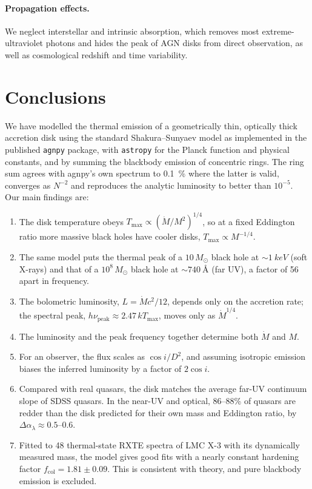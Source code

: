\documentclass[11pt,a4paper]{article}
\newcommand{\Msun}{M_\odot}
\newcommand{\Mdot}{\dot M}
\newcommand{\Tmax}{T_{\max}}
\newcommand{\nupk}{\nu_{\mathrm{peak}}}
\begin{document}
\paragraph{Propagation effects.} We neglect interstellar and intrinsic
absorption, which removes most extreme-ultraviolet photons and
hides the peak of AGN disks from direct observation, as well as
cosmological redshift and time variability.

\section{Conclusions}

We have modelled the thermal emission of a geometrically thin, optically
thick accretion disk using the standard Shakura--Sunyaev model as implemented
in the published \texttt{agnpy} package, with \texttt{astropy} for the
Planck function and physical constants, and by summing the blackbody
emission of concentric rings. The ring sum agrees with agnpy's own spectrum
to \SI{0.1}{\percent} where the latter is valid, converges as $N^{-2}$ and
reproduces the analytic luminosity to better than $10^{-5}$. Our main
findings are:
\begin{enumerate}
  \item The disk temperature obeys $\Tmax\propto(\Mdot/M^2)^{1/4}$, so at a
        fixed Eddington ratio more massive black holes have cooler disks,
        $\Tmax\propto M^{-1/4}$.
  \item The same model puts the thermal peak of a $10\,\Msun$ black hole at
        $\sim\SI{1}{keV}$ (soft X-rays) and that of a $10^8\,\Msun$ black hole at
        $\sim\SI{740}{\angstrom}$ (far UV), a factor of 56 apart in frequency.
  \item The bolometric luminosity, $L=\Mdot c^2/12$, depends only on the
        accretion rate; the spectral peak, $h\nupk\approx2.47\,k\Tmax$, moves
        only as $\Mdot^{1/4}$.
  \item The luminosity and the peak frequency together determine both
        $\Mdot$ and $M$.
  \item For an observer, the flux scales as $\cos i/D^2$, and assuming
        isotropic emission biases the inferred luminosity by a factor of
        $2\cos i$.
  \item Compared with real quasars, the disk matches the average far-UV
        continuum slope of SDSS quasars. In the near-UV and optical,
        86--88\% of quasars are redder than the disk predicted for their own
        mass and Eddington ratio, by $\Delta\alpha_\lambda\approx0.5$--0.6.
  \item Fitted to 48 thermal-state RXTE spectra of LMC X-3 with its
        dynamically measured mass, the model gives good fits with a nearly
        constant hardening factor $f_{\mathrm{col}}=1.81\pm0.09$. This is
        consistent with theory, and pure blackbody emission is excluded.
\end{enumerate}
\end{document}
